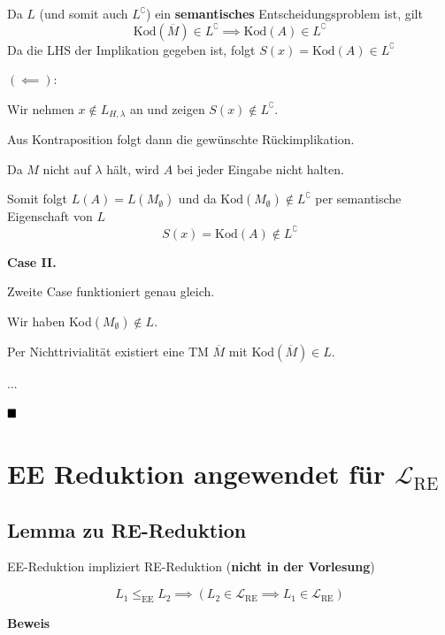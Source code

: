 \documentclass[a4paper, 11pt]{article}
\def\Lre{\mathcal{L}_\text{RE}}
\newcommand\myTitle[1]{{\large \textbf {#1}}}
\begin{document}
                        
                        Da $L$ (und somit auch $L^\complement$) ein \textbf{semantisches} Entscheidungsproblem ist, gilt 
                        $$\text{Kod}(\overline{M}) \in L^\complement \implies \text{Kod}(A) \in L^\complement$$
                        Da die LHS der Implikation gegeben ist, folgt $S(x) = \text{Kod}(A) \in L^\complement$
                            
                        $\mathbf{(\impliedby):}$
                    
                        Wir nehmen $x \notin L_{H, \lambda}$ an und zeigen $S(x) \notin L^\complement$. 
                    
                        Aus Kontraposition folgt dann die gewünschte Rückimplikation.
                    
                        
                        Da $M$ nicht auf $\lambda$ hält, wird $A$ bei jeder Eingabe nicht halten.
                    
                        
                        Somit folgt $L(A) = L(M_{\emptyset})$ und da $\text{Kod}(M_{\emptyset}) \notin L^\complement$ per semantische Eigenschaft von $L$
                        $$S(x) = \text{Kod}(A) \notin L^\complement$$
                    
                    
                    
                        \myTitle{Case II.}

                        Zweite Case funktioniert genau gleich.
                    
                        Wir haben Kod$(M_{\emptyset}) \notin L$. 
                        
                        Per Nichttrivialität existiert eine TM $\overline{M}$ mit Kod$(\overline{M}) \in L$.
                        
                        ...
                        
                        $\hfill\blacksquare$
                    
                        \section{EE Reduktion angewendet für $\Lre$}

                        
                            \subsection{Lemma zu RE-Reduktion}
                            EE-Reduktion impliziert RE-Reduktion (\textbf{nicht in der Vorlesung})
                            \begin{mainbox}{}
                                $$L_1 \leq_{\text{EE}} L_2 \implies (L_2 \in \Lre \implies L_1 \in \Lre)$$
                            \end{mainbox}
                            \textbf{Beweis}
                        
\end{document}
